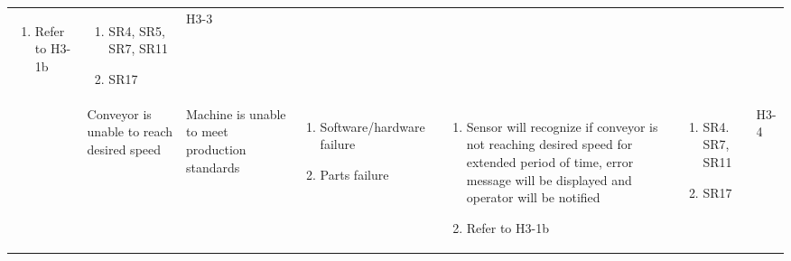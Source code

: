 \documentclass{article}
\begin{document}
\begin{landscape}
\begin{center}
\begin{longtable}{|l|  p{3cm}  p{4cm}  p{3cm}  p{4cm}  p{2cm}  p{1cm}|}
\begin{enumerate}[label=(\alph*)]
            \item Refer to H3-1b
        \end{enumerate}&
        \begin{enumerate}[label=(\alph*)]
            \item SR4, SR5, SR7, SR11
            \item SR17
        \end{enumerate}&
        H3-3\\

        &
        Conveyor is unable to reach desired speed&
        Machine is unable to meet production standards&
        \begin{enumerate}[label=(\alph*)]
            \item Software/hardware failure
            \item Parts failure
        \end{enumerate}&
        \begin{enumerate}[label=(\alph*)]
            \item  Sensor will recognize if conveyor is not reaching desired speed for extended period of time, error message will be displayed and operator will be notified
            \item Refer to H3-1b
        \end{enumerate}&
        \begin{enumerate}[label=(\alph*)]
            \item SR4. SR7, SR11
            \item SR17
        \end{enumerate}&
        H3-4\\

        \hline


\end{longtable}
\end{center}
\end{landscape}
\end{document}
